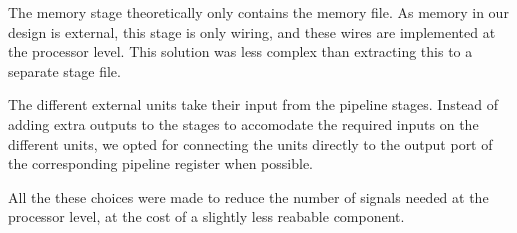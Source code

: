 The memory stage theoretically only contains the memory file. As memory in our design
is external, this stage is only wiring, and these wires are implemented at the 
processor level. This solution was less complex than extracting this to a separate
stage file.

The different external units take their input from the pipeline stages. Instead
of adding extra outputs to the stages to accomodate the required inputs on the
different units, we opted for connecting the units directly to the output port of the
corresponding pipeline register when possible. 

All the these choices were made to reduce the number of signals needed at the processor level,
at the cost of a slightly less reabable component.


